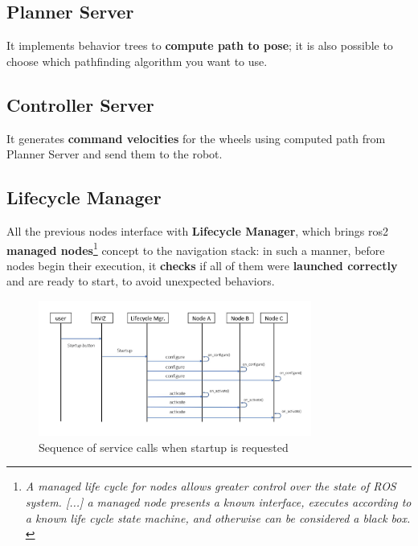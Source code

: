 \subsection{Planner Server}

It implements behavior trees to \textbf{compute path to pose}; it is also possible to choose which pathfinding algorithm you want to use.

\subsection{Controller Server}

It generates \textbf{command velocities} for the wheels using computed path from Planner Server and send them to the robot.



\subsection{Lifecycle Manager}

All the previous nodes interface with \textbf{Lifecycle Manager}, which brings \acrshort{ros}2 \textbf{managed nodes}\footnote{\textit{A managed life cycle for nodes allows greater control over the state of ROS system. [...] a managed node presents a known interface, executes according to a known life cycle state machine, and otherwise can be considered a black box.} \cite{lifecycle}} concept to the navigation stack: in such a manner, before nodes begin their execution, it \textbf{checks} if all of them were \textbf{launched correctly} and are ready to start, to avoid unexpected behaviors.

\begin{figure}[h]
    \centering
    \includegraphics[width=0.8\textwidth]{images/uml_lifecycle_manager}
    \caption{Sequence of service calls when startup is requested}
\end{figure}

